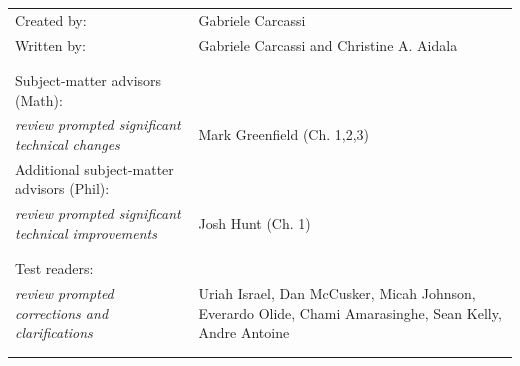 \documentclass[11pt,letterpaper,fleqn]{memoir} %
\begin{document}
\begin{table}[h]
\centering
\begin{tabular}{>{\raggedleft}p{} >{\raggedright\arraybackslash}p{}}
Created by: & Gabriele Carcassi \\
Written by: & Gabriele Carcassi and Christine A. Aidala \\
& \\
& \\
Subject-matter advisors (Math): \\ \textit{\footnotesize review prompted significant technical changes} & Mark Greenfield (Ch. 1,2,3) \\
Additional subject-matter advisors (Phil): \\ \textit{\footnotesize review prompted significant technical improvements} & Josh Hunt (Ch. 1) \\
& \\
& \\
Test readers: \\ \textit{\footnotesize review prompted corrections and clarifications} & Uriah Israel, Dan McCusker, Micah Johnson, Everardo Olide, Chami Amarasinghe, Sean Kelly, Andre Antoine \\
& \\
& \\





\end{tabular} 
\end{table}


	
\end{document}
